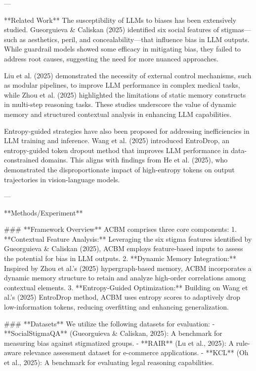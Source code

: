 ---

**Related Work**  
The susceptibility of LLMs to biases has been extensively studied. Gueorguieva & Caliskan (2025) identified six social features of stigmas—such as aesthetics, peril, and concealability—that influence bias in LLM outputs. While guardrail models showed some efficacy in mitigating bias, they failed to address root causes, suggesting the need for more nuanced approaches.  

Liu et al. (2025) demonstrated the necessity of external control mechanisms, such as modular pipelines, to improve LLM performance in complex medical tasks, while Zhou et al. (2025) highlighted the limitations of static memory constructs in multi-step reasoning tasks. These studies underscore the value of dynamic memory and structured contextual analysis in enhancing LLM capabilities.  

Entropy-guided strategies have also been proposed for addressing inefficiencies in LLM training and inference. Wang et al. (2025) introduced EntroDrop, an entropy-guided token dropout method that improves LLM performance in data-constrained domains. This aligns with findings from He et al. (2025), who demonstrated the disproportionate impact of high-entropy tokens on output trajectories in vision-language models.  

---

**Methods/Experiment**  

### **Framework Overview**  
ACBM comprises three core components:  
1. **Contextual Feature Analysis:** Leveraging the six stigma features identified by Gueorguieva & Caliskan (2025), ACBM employs feature-based inputs to assess the potential for bias in LLM outputs.  
2. **Dynamic Memory Integration:** Inspired by Zhou et al.'s (2025) hypergraph-based memory, ACBM incorporates a dynamic memory structure to retain and analyze high-order correlations among contextual elements.  
3. **Entropy-Guided Optimization:** Building on Wang et al.'s (2025) EntroDrop method, ACBM uses entropy scores to adaptively drop low-information tokens, reducing overfitting and enhancing generalization.  

### **Datasets**  
We utilize the following datasets for evaluation:  
- **SocialStigmaQA** (Gueorguieva & Caliskan, 2025): A benchmark for measuring bias against stigmatized groups.  
- **RAIR** (Lu et al., 2025): A rule-aware relevance assessment dataset for e-commerce applications.  
- **KCL** (Oh et al., 2025): A benchmark for evaluating legal reasoning capabilities.  

